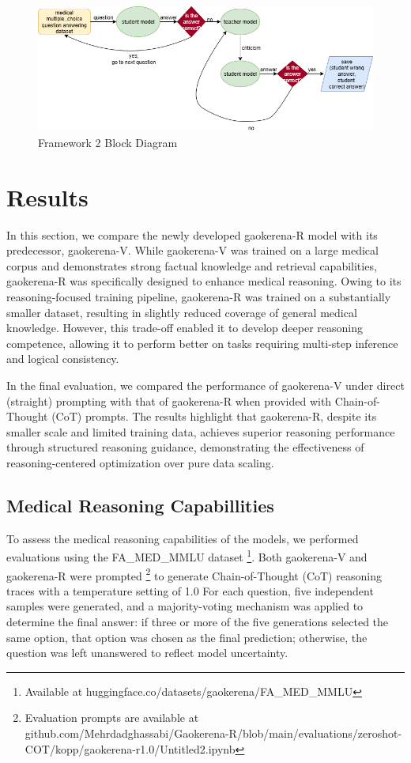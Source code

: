 \documentclass[conference]{IEEEtran}
\begin{document}
\begin{figure}[h]
    \centering
    \includegraphics[width=1.0\linewidth]{fig2.png}
    \caption{Framework 2 Block Diagram}
    \label{fig2}
\end{figure}


          \section{Results}
In this section, we compare the newly developed gaokerena-R model with its predecessor, gaokerena-V. While gaokerena-V was trained on a large medical corpus and demonstrates strong factual knowledge and retrieval capabilities, gaokerena-R was specifically designed to enhance medical reasoning. Owing to its reasoning-focused training pipeline, gaokerena-R was trained on a substantially smaller dataset, resulting in slightly reduced coverage of general medical knowledge. However, this trade-off enabled it to develop deeper reasoning competence, allowing it to perform better on tasks requiring multi-step inference and logical consistency.  

In the final evaluation, we compared the performance of gaokerena-V under direct (straight) prompting with that of gaokerena-R when provided with Chain-of-Thought (CoT) prompts. The results highlight that gaokerena-R, despite its smaller scale and limited training data, achieves superior reasoning performance through structured reasoning guidance, demonstrating the effectiveness of reasoning-centered optimization over pure data scaling.
          \subsection{Medical Reasoning Capabillities}
To assess the medical reasoning capabilities of the models, we performed evaluations using the FA\_MED\_MMLU dataset
\footnote{Available at huggingface.co/datasets/gaokerena/FA\_MED\_MMLU}.
 Both gaokerena-V and gaokerena-R were prompted
\footnote{Evaluation prompts are available at github.com/Mehrdadghassabi/Gaokerena-R/blob/main/evaluations/zeroshot-COT/kopp/gaokerena-r1.0/Untitled2.ipynb} 
to generate Chain-of-Thought (CoT) reasoning traces with a temperature setting of 1.0 For each question, five independent samples were generated, and a majority-voting mechanism was applied to determine the final answer: if three or more of the five generations selected the same option, that option was chosen as the final prediction; otherwise, the question was left unanswered to reflect model uncertainty.  
\end{document}
